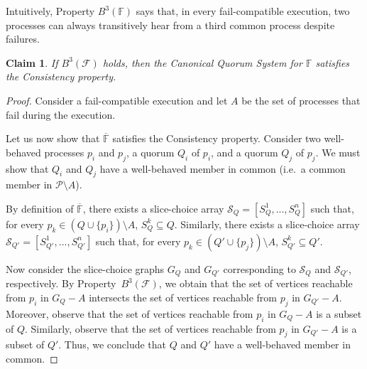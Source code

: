 \documentclass[11pt,letterpaper]{article}
\newtheorem{claim}{Claim}
\begin{document}
Intuitively, Property $B^3(\mathbb{F})$ says that, in every fail-compatible execution, two processes can always transitively hear from a third common process despite failures.

\begin{claim}
  \label{thm:canonical}
  If $B^3(\mathcal{F})$ holds, then the Canonical Quorum System for $\mathbb{F}$ satisfies the  Consistency property.
\end{claim}
\begin{proof}
  Consider a fail-compatible execution and let $A$ be the set of processes that fail during the execution.

  Let us now show that $\overline{\mathbb{F}}$ satisfies the Consistency property.
  Consider two well-behaved processes $p_i$ and $p_j$, a quorum $Q_i$ of $p_i$, and a quorum $Q_j$ of $p_j$.
  We must show that $Q_i$ and $Q_j$ have a well-behaved member in common (i.e.\ a common member in $\mathcal{P}\setminus A$).

  By definition of $\overline{\mathbb{F}}$, there exists a slice-choice array $\mathcal{S}_Q=\left[S_Q^1,...,S_Q^n\right]$ such that, for every $p_k\in (Q\cup\{p_i\})\setminus A$, $S_Q^k\subseteq Q$.
  Similarly, there exists a slice-choice array $\mathcal{S}_{Q'}=\left[S_{Q'}^1,...,S_{Q'}^n\right]$ such that, for every $p_k\in (Q'\cup\{p_j\})\setminus A$, $S_{Q'}^k\subseteq Q'$.

  Now consider the slice-choice graphs $G_Q$ and $G_{Q'}$ corresponding to $\mathcal{S}_Q$ and $\mathcal{S}_{Q'}$, respectively.
  By Property~$B^3(\mathcal{F})$, we obtain that the set of vertices reachable from $p_i$ in $G_Q-A$ intersects the set of vertices reachable from $p_j$ in $G_{Q'}-A$.
  Moreover, observe that the set of vertices reachable from $p_i$ in $G_Q-A$ is a subset of $Q$.
  Similarly, observe that the set of vertices reachable from $p_j$ in $G_{Q'}-A$ is a subset of $Q'$.
  Thus, we conclude that $Q$ and $Q'$ have a well-behaved member in common.
\end{proof}
\end{document}
